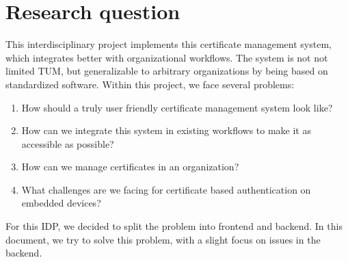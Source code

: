 \section*{Research question}
This interdisciplinary project implements this certificate management system, which integrates better with
organizational workflows.
The system is not not limited TUM, but generalizable to arbitrary organizations by being based on standardized software.
Within this project, we face several problems:
\begin{enumerate}
    \item How should a truly user friendly certificate management system look like?
    \item How can we integrate this system in existing workflows to make it as accessible as possible?
    \item How can we manage certificates in an organization?
    \item What challenges are we facing for certificate based authentication on embedded devices?
\end{enumerate}

For this IDP, we decided to split the problem into frontend and backend.
In this document, we try to solve this problem, with a slight focus on issues in the backend.
